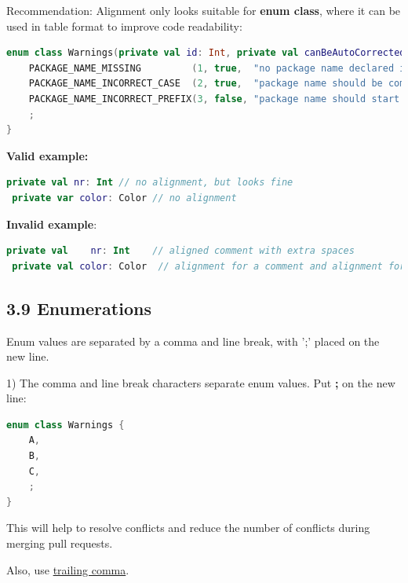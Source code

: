 Recommendation: Alignment only looks suitable for \textbf{enum class}, where it can be used in table format to improve code readability:

\begin{lstlisting}[language=Kotlin]
enum class Warnings(private val id: Int, private val canBeAutoCorrected: Boolean, private val warn: String) : Rule {
    PACKAGE_NAME_MISSING         (1, true,  "no package name declared in a file"),
    PACKAGE_NAME_INCORRECT_CASE  (2, true,  "package name should be completely in a lower case"),
    PACKAGE_NAME_INCORRECT_PREFIX(3, false, "package name should start from the company's domain")
    ;
}
\end{lstlisting}


\textbf{Valid example:}

\begin{lstlisting}[language=Kotlin]
 private val nr: Int // no alignment, but looks fine
 private var color: Color // no alignment
\end{lstlisting}


\textbf{Invalid example}:

\begin{lstlisting}[language=Kotlin]
 private val    nr: Int    // aligned comment with extra spaces
 private val color: Color  // alignment for a comment and alignment for identifier name
\end{lstlisting}


\subsection*{\textbf{3.9 Enumerations}}

\label{sec:3.9}

Enum values are separated by a comma and line break, with ';' placed on the new line.



1) The comma and line break characters separate enum values. Put \textbf{;} on the new line:

\begin{lstlisting}[language=Kotlin]
enum class Warnings {
    A,
    B,
    C,
    ;
}
\end{lstlisting}


This will help to resolve conflicts and reduce the number of conflicts during merging pull requests.

Also, use \href{https://kotlinlang.org/docs/reference/whatsnew14.html#trailing-comma}{trailing comma}.



